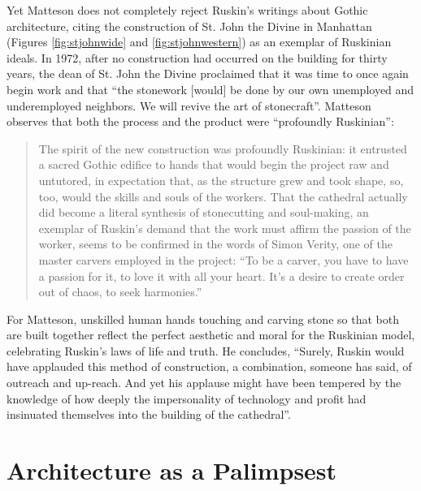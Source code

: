 Yet Matteson does not completely reject Ruskin’s writings about Gothic
architecture, citing the construction of St. John the Divine in
Manhattan (Figures \ref{fig:stjohnwide} and \ref{fig:stjohnwestern}) as an exemplar of Ruskinian ideals.  In 1972,
after no construction had occurred on the building for thirty years,
the dean of St. John the Divine proclaimed that it was time to once
again begin work and that “the stonework [would] be done by our own
unemployed and underemployed neighbors.  We will revive the art of
stonecraft”\citep[][pg. 300]{matteson2002}. Matteson observes that both the
process and the product were ``profoundly
Ruskinian'': 


\begin{quote}
The spirit of the new construction was profoundly Ruskinian: it
entrusted a sacred Gothic edifice to hands that would begin the project
raw and untutored, in expectation that, as the structure grew and took
shape, so, too, would the skills and souls of the workers.  That the
cathedral actually did become a literal synthesis of stonecutting and
soul-making, an exemplar of Ruskin’s demand that the work must affirm
the passion of the worker, seems to be confirmed in the words of Simon
Verity, one of the master carvers employed in the project: “To be a
carver, you have to have a passion for it, to love it with all your
heart.  It’s a desire to create order out of chaos, to seek 
harmonies.”\citep[][pgs. 300--301]{matteson2002}
\end{quote}

For Matteson, unskilled human hands touching and carving stone so that
both are built together reflect the perfect aesthetic and moral for the
Ruskinian model, celebrating Ruskin’s laws of life and truth.  He
concludes, “Surely, Ruskin would have applauded this method of
construction, a combination, someone has said, of outreach and
up-reach.  And yet his applause might have been tempered by the
knowledge of how deeply the impersonality of technology and profit had
insinuated themselves into the building of the cathedral”\citep[][pg. 301]{matteson2002}.  

\section{Architecture as a Palimpsest}

